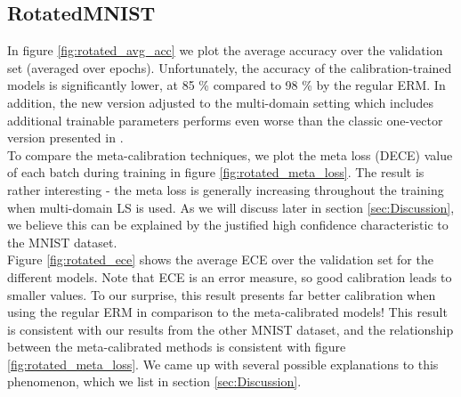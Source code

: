 \documentclass[12pt,a4paper]{article}
\begin{document}
	\subsection{RotatedMNIST}
		In figure \ref{fig:rotated_avg_acc} we plot the average accuracy over the validation set (averaged over epochs). Unfortunately, the accuracy of the calibration-trained models is significantly lower, at 85 \% compared to 98 \% by the regular ERM. In addition, the new version adjusted to the multi-domain setting which includes additional trainable parameters performs even worse than the classic one-vector version presented in \cite{bohdal2021meta}.\\
		To compare the meta-calibration techniques, we plot the meta loss (DECE) value of each batch during training in figure \ref{fig:rotated_meta_loss}. The result is rather interesting - the meta loss is generally increasing throughout the training when multi-domain LS is used. As we will discuss later in section \ref{sec:Discussion}, we believe this can be explained by the justified high confidence characteristic to the MNIST dataset.\\
		Figure \ref{fig:rotated_ece} shows the average ECE over the validation set for the different models. Note that ECE is an error measure, so good calibration leads to smaller values. To our surprise, this result presents far better calibration when using the regular ERM in comparison to the meta-calibrated models! This result is consistent with our results from the other MNIST dataset, and the relationship between the meta-calibrated methods is consistent with figure \ref{fig:rotated_meta_loss}. We came up with several possible explanations to this phenomenon, which we list in section \ref{sec:Discussion}.
		
\end{document}
